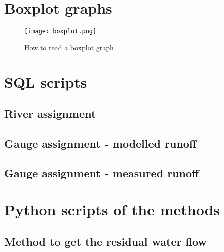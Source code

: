 \appendix
\chapter{Boxplot graphs}
\label{app:boxplot}

\begin{figure}[H]
\centering
\texttt{[image: boxplot.png]}
\caption[How to read a boxplot graph]{How to read a boxplot graph \cite{stk_boxplot}}
\label{boxlot}
\end{figure}

\chapter{SQL scripts}
\section{River assignment}
\label{app:sql_assign_river}




\section{Gauge assignment - modelled runoff}
\label{app:sql_assign_watergap}




\section{Gauge assignment - measured runoff}
\label{app:sql_assign_gauge}



\chapter{Python scripts of the methods}
\section{Method to get the residual water flow}
\label{app:get_dV_res}



